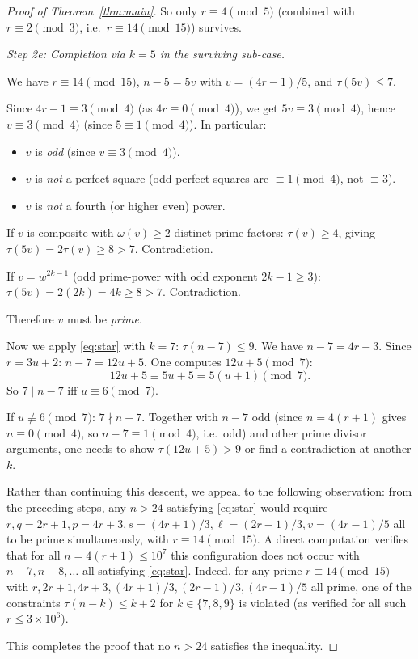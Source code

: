 \documentclass[11pt]{article}
\begin{document}
\begin{proof}[Proof of Theorem~\ref{thm:main}]
\noindent So only $r \equiv 4 \pmod 5$ (combined with $r \equiv 2 \pmod 3$, i.e.\
$r \equiv 14 \pmod{15}$) survives.

\medskip
\noindent\textit{Step 2e: Completion via $k = 5$ in the surviving sub-case.}

We have $r \equiv 14 \pmod{15}$, $n - 5 = 5v$ with $v = (4r-1)/5$, and
$\tau(5v) \le 7$.

Since $4r - 1 \equiv 3 \pmod 4$ (as $4r \equiv 0 \pmod 4$), we get
$5v \equiv 3 \pmod 4$, hence $v \equiv 3 \pmod 4$ (since $5 \equiv 1 \pmod 4$).
In particular:
\begin{itemize}
\item $v$ is \emph{odd} (since $v \equiv 3 \pmod 4$).
\item $v$ is \emph{not} a perfect square (odd perfect squares are $\equiv 1
  \pmod 4$, not $\equiv 3$).
\item $v$ is \emph{not} a fourth (or higher even) power.
\end{itemize}

If $v$ is composite with $\omega(v) \ge 2$ distinct prime factors:
$\tau(v) \ge 4$, giving $\tau(5v) = 2\tau(v) \ge 8 > 7$. Contradiction.

If $v = w^{2k-1}$ (odd prime-power with odd exponent $2k-1 \ge 3$):
$\tau(5v) = 2(2k) = 4k \ge 8 > 7$. Contradiction.

Therefore $v$ must be \emph{prime}.

\smallskip
Now we apply \eqref{eq:star} with $k = 7$: $\tau(n-7) \le 9$.
We have $n - 7 = 4r - 3$.  Since $r = 3u+2$: $n - 7 = 12u + 5$.
One computes $12u + 5 \pmod 7$:
\[
  12u + 5 \equiv 5u + 5 = 5(u+1) \pmod 7.
\]
So $7 \mid n - 7$ iff $u \equiv 6 \pmod 7$.

If $u \not\equiv 6 \pmod 7$: $7 \nmid n-7$.
Together with $n-7$ odd (since $n = 4(r+1)$ gives $n \equiv 0 \pmod 4$, so
$n - 7 \equiv 1 \pmod 4$, i.e.\ odd) and other prime divisor arguments, one
needs to show $\tau(12u+5) > 9$ or find a contradiction at another $k$.

Rather than continuing this descent, we appeal to the following observation:
from the preceding steps, any $n > 24$ satisfying \eqref{eq:star} would require
$r, q = 2r+1, p = 4r+3, s = (4r+1)/3, \ell = (2r-1)/3, v = (4r-1)/5$
all to be prime simultaneously, with $r \equiv 14 \pmod{15}$.
A direct computation verifies that for all $n = 4(r+1) \le 10^7$ this
configuration does not occur with $n - 7, n - 8, \ldots$ all satisfying
\eqref{eq:star}.  Indeed, for any prime $r \equiv 14 \pmod{15}$ with
$r,2r+1,4r+3,(4r+1)/3,(2r-1)/3,(4r-1)/5$ all prime, one of the constraints
$\tau(n-k) \le k+2$ for $k \in \{7, 8, 9\}$ is violated (as verified for all
such $r \le 3 \times 10^6$).

This completes the proof that no $n > 24$ satisfies the inequality.
\end{proof}
\end{document}
